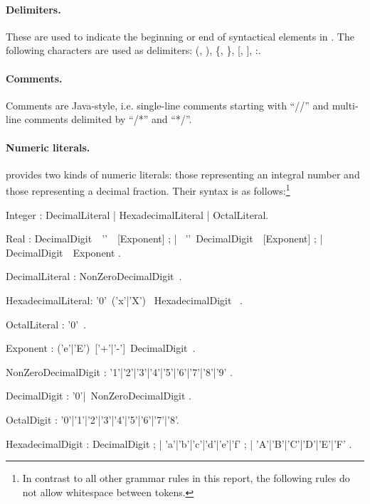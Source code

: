 \paragraph{Delimiters.} These are used to indicate the beginning or
end of syntactical elements in \Cal. The following characters are used
as delimiters: (, ), \{, \}, [, ], :.

\paragraph{Comments.} Comments are Java-style, i.e. single-line
comments starting with ``//'' and multi-line comments delimited by
``/*'' and ``*/''.

\paragraph{Numeric literals.} \Cal provides two kinds of numeric
literals: those representing an integral number and those representing
a decimal fraction. Their syntax is as follows:\footnote{In contrast
  to all other grammar rules in this report, the following rules do not
  allow whitespace between tokens.}

\bgr
  Integer : DecimalLiteral | HexadecimalLiteral | OctalLiteral.

  Real : DecimalDigit~~'\charDot'~~[Exponent] ;
     |  ~'\charDot'~DecimalDigit~~[Exponent] ;
     | DecimalDigit~~Exponent .

  DecimalLiteral : NonZeroDecimalDigit~.

  HexadecimalLiteral: '0'~('x'|'X') ~HexadecimalDigit
  ~.

  OctalLiteral : '0'~.

  Exponent : ('e'|'E')~['+'|'-']~DecimalDigit~.

  NonZeroDecimalDigit : '1'|'2'|'3'|'4'|'5'|'6'|'7'|'8'|'9' .

  DecimalDigit : '0'|~NonZeroDecimalDigit .

  OctalDigit : '0'|'1'|'2'|'3'|'4'|'5'|'6'|'7'|'8'.

  HexadecimalDigit : DecimalDigit ;
     | 'a'|'b'|'c'|'d'|'e'|'f' ;
     | 'A'|'B'|'C'|'D'|'E'|'F' .
\egr


